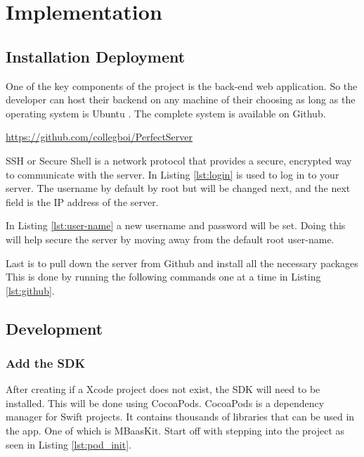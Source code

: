 \chapter{Implementation}


\section{Installation Deployment}

One of the key components of the project is the back-end web application. So the developer can host their backend on any machine of their choosing as long as the operating system is Ubuntu . The complete system is available on Github.

\url{https://github.com/collegboi/PerfectServer}



SSH or Secure Shell is a network protocol that provides a secure, encrypted way to communicate with the server. In Listing \ref{lst:login} is used to log in to your server. The username by default by root but will be changed next, and the next field is the IP address of the server.




 In Listing \ref{lst:user-name} a new username and password will be set. Doing this will help secure the server by moving away from the default root user-name.


Last is to pull down the server from Github and install all the necessary packages This is done by running the following commands one at a time in Listing \ref{lst:github}.

\section{Development}

\subsection{Add the SDK}



After creating if a Xcode project does not exist, the SDK will need to be installed. This will be done using CocoaPods. CocoaPods is a dependency manager for Swift projects. It contains thousands of libraries that can be used in the app. One of which is MBaasKit. Start off with stepping into the project as seen in Listing \ref{lst:pod_init}.

